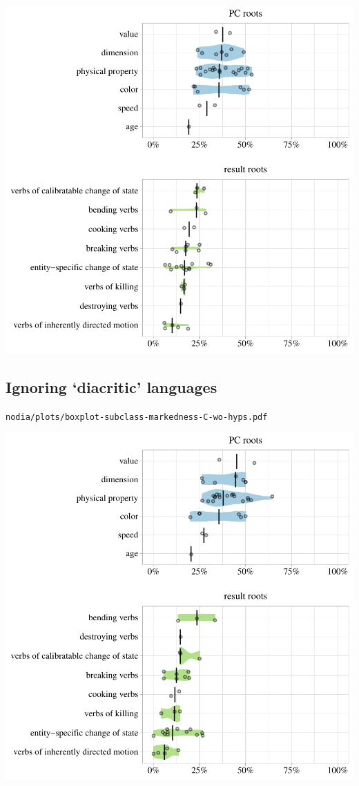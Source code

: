 \includegraphics[width=1.0\textwidth]{../nolow/plots/boxplot-subclass-markedness-C-wo-hyps.pdf}

\subsection{Ignoring `diacritic' languages}

\texttt{nodia/plots/boxplot-subclass-markedness-C-wo-hyps.pdf}

\includegraphics[width=1.0\textwidth]{../nodia/plots/boxplot-subclass-markedness-C-wo-hyps.pdf}

